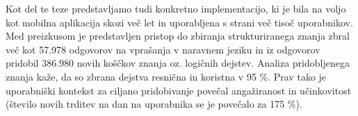 Kot del te teze predstavljamo tudi konkretno implementacijo, ki je bila na voljo kot mobilna aplikacija skozi več let in uporabljena s strani več tisoč uporabnikov. Med preizkusom je predstavljen pristop do zbiranja strukturiranega znanja zbral več kot 57.978 odgovorov na vprašanja v naravnem jeziku in iz odgovorov pridobil 386.980 novih koščkov znanja oz. logičnih dejstev. Analiza pridobljenega znanja kaže, da so zbrana dejstva resnična in koristna v 95 \%. Prav tako je uporabniški kontekst za ciljano pridobivanje povečal angažiranost in učinkovitost (število novih trditev na dan na uporabnika se je povečalo za 175 \%).